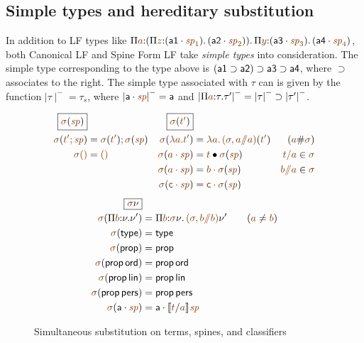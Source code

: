 \subsection{Simple types and hereditary substitution}

In addition to LF types like $\lfpi{a}{(\lfpi{z}{(\lfroot{\sf
      a1}{\spi_1})}{\,(\lfroot{\sf
      a2}{\spi_2})})}{\,\lfpi{y}{(\lfroot{\sf
      a3}{\spi_3})}{\,(\lfroot{\sf a4}{\spi_4})}}$, both Canonical LF
and Spine Form LF take {\it simple types} into consideration. The
simple type corresponding to the type above is $({\sf a1} \supset {\sf
  a2}) \supset {\sf a3} \supset {\sf a4}$, where ${\supset}$
associates to the right. The simple type associated with
$\tau$ can is given by the function ${\mid}\tau{\mid}^- = \tau_s$, where
${\mid}\lfroot{\sf a}{\spi}{\mid}^- = {\sf a}$ and
${\mid}\lfpi{a}{\tau}{\tau'}{\mid}^- = {\mid}\tau{\mid}^- \supset
{\mid}\tau'{\mid}^-$. 


\begin{figure}
\begin{align*}
\fbox{$\lf{\sigma}(\lf{\spi})$}&
&
\fbox{$\lf{\sigma}(\lf{t'})$}
\\
\lf{\sigma}(\lf{t'; \spi}) 
 & = \lf{\no{\lf{\sigma}(\lf{t'})}; \no{\lf{\sigma}(\lf{\spi})}} &
\lf{\sigma}(\lf{\lambda a.t'}) 
 & = \lf{\lambda a.\,\no{\lf{(\sigma, a/\!\!/a)}(\lf{t'})}}
 & (\lf{a} \# \lf{\sigma})
\\
\lf{\sigma}\lfnil 
 & = \lfnil &
\lf{\sigma}(\lf{\lfroot{a}{\spi}}) 
 & = \subst{\lf t}{\no{\lf{\sigma}(\lf{\spi})}}
      & \lf{t/a} \in \lf{\sigma} 
\\
& &
\lf{\sigma}(\lf{\lfroot{a}{\spi}}) 
 & = \lf{\lfroot{b}{\no{\lf{\sigma}(\lf{\spi})}}} 
      & \lf{b/\!\!/a} \in \lf{\sigma} 
\\
& &
\lf{\sigma}(\lf{\lfroot{\sf c}{\spi}}) 
 & = \lf{\lfroot{\sf c}{\no{\lf{\sigma}(\lf{\spi})}}} 
\end{align*}\begin{align*}
\fbox{$\lf{\sigma}{\nu}$} &
\\
\lf{\sigma}(\lfpi{b}{\nu}{\nu'})
 & = \lfpi{b}{\lf{\sigma}\nu}{\,\lf{(\sigma, b/\!\!/b)}\nu'}
     \qquad (\lf a \neq \lf b) 
\\
\lf{\sigma}({\sf type})
  & = {\sf type}
\\ 
\lf{\sigma}({\sf prop}) 
 & = {\sf prop} 
\\
\lf{\sigma}({\sf prop}\,{\sf ord}) 
 & = {\sf prop}\,{\sf ord} 
\\
\lf{\sigma}({\sf prop}\,{\sf lin}) 
 & = {\sf prop}\,{\sf lin} 
\\
\lf{\sigma}({\sf prop}\,{\sf pers}) 
 & = {\sf prop}\,{\sf pers} 
\\
\lf{\sigma}(\lfroot{\sf a}{\spi}) 
 & = \lfroot{\sf a}{\no{\rsubst{\lf{t}}{\lf{a}}{\lf{\spi}}}} 
\end{align*}
\caption{Simultaneous substitution on terms, spines, and classifiers}
\label{fig:simsubst}
\end{figure}

